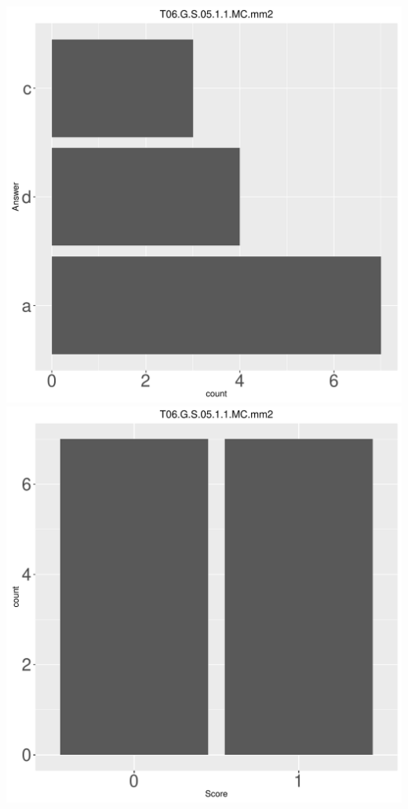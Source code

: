 \documentclass[12pt,english,nohyper]{tufte-handout}\usepackage[]{graphicx}\usepackage[]{color}
\begin{document}
\begin{center} \includegraphics[width=.45\linewidth]{Topic06_AB_75_answer} \includegraphics[width=.45\linewidth]{Topic06_AB_75_score} \end{center} 
\end{document}
